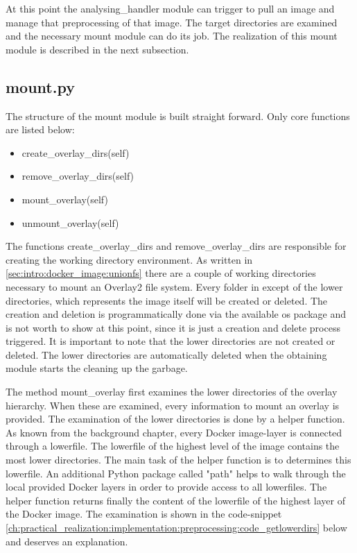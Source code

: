 At this point the analysing\_handler module can trigger to pull an image and manage that preprocessing of that image. The target directories are examined and the necessary mount module can do its job. The realization of this mount module is described in the next subsection.

\subsection{mount.py}	
\label{ch:practical_realization:implementation:mount}
The structure of the mount module is built straight forward. Only core functions are listed below:
\begin{itemize}
\item create\_overlay\_dirs(self)
\item remove\_overlay\_dirs(self)
\item mount\_overlay(self)
\item unmount\_overlay(self)
\end{itemize}
The functions create\_overlay\_dirs and remove\_overlay\_dirs are responsible for creating the working directory environment. As written in \ref{sec:intro:docker_image:unionfs} there are a couple of working directories necessary to mount an Overlay2 file system.
Every folder in except of the lower directories, which represents the image itself will be created or deleted. The creation and deletion is programmatically done via the available os package and is not worth to show at this point, since it is just a creation and delete process triggered. It is important to note that the lower directories are not created or deleted. The lower directories are automatically deleted when the obtaining module starts the cleaning up the garbage.
 
The method mount\_overlay first examines the lower directories of the overlay hierarchy. When these are examined, every information to mount an overlay is provided.
The examination of the lower directories is done by a helper function.
As known from the background chapter, every Docker image-layer is connected through a lowerfile.
The lowerfile of the highest level of the image contains the most lower directories. 
The main task of the helper function is to determines this lowerfile.
An additional Python package called "path" helps to walk through the local provided Docker layers in order to provide access to all lowerfiles. The helper function returns finally the content of the lowerfile of the highest layer of the Docker image.
The examination is shown in the code-snippet \ref{ch:practical_realization:implementation:preprocessing:code_getlowerdirs} below and deserves an explanation.

